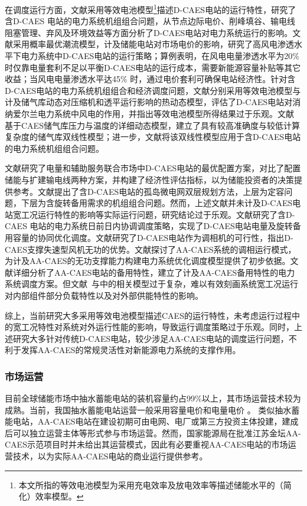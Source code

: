 在调度运行方面，文献采用等效电池模型\footnote{本文所指的等效电池模型为采用充电效率及放电效率等描述储能水平的（简化）效率模型。}描述D-CAES电站的运行特性，研究了含D-CAES 电站的电力系统机组组合问题，从节点边际电价、削峰填谷、输电线阻塞管理、弃风及环境效益等方面分析了D-CAES电站对电力系统运行的影响。文献采用概率最优潮流模型，计及储能电站对市场电价的影响，研究了高风电渗透水平下电力系统中D-CAES电站的运行策略；算例表明，在风电电量渗透水平为20\%时仅靠电量套利不足以平衡D-CAES电站的运行成本，需要新能源容量补贴等其它收益；当风电电量渗透水平达45\% 时，通过电价套利可确保电站经济性。针对含D-CAES电站的电力系统机组组合和经济调度问题，文献分别采用等效电池模型与计及储气库动态对压缩机和透平运行影响的热动态模型，评估了D-CAES电站对消纳爱尔兰电力系统中风电的作用，并指出等效电池模型所得结果过于乐观。文献~ 基于CAES储气库压力与温度的详细动态模型，建立了具有较高准确度与较低计算复杂度的储气库双线性模型；进一步，文献将该双线性模型应用于含D-CAES电站的电力系统机组组合问题。

文献研究了电量和辅助服务联合市场中D-CAES电站的最优配置方案，对比了配置储能与扩建输电线两种方案，并构建了经济性评估指标，以为储能投资者的决策提供参考。文献提出了含D-CAES电站的孤岛微电网双层规划方法，上层为定容问题，下层为含旋转备用需求的机组组合问题。然而，上述文献并未计及D-CAES电站宽工况运行特性的影响等实际运行问题，研究结论过于乐观。文献研究了含D-CAES 电站的电力系统日前日内协调调度策略，实现了D-CAES电站电量及旋转备用容量的协同优化调度。文献研究了D-CAES电站作为调相机的可行性，指出D-CAES支撑失速型风机无功的优势。文献探讨了AA-CAES系统的调相运行模式，为计及AA-CAES的无功支撑能力构建电力系统优化调度模型提供了初步依据。文献详细分析了AA-CAES电站的备用特性，建立了计及AA-CAES备用特性的电力系统调度方案。但文献~与中的相关模型过于复杂，难以有效刻画系统宽工况运行对内部组件部分负载特性以及对外部供能特性的影响。

综上，当前研究大多采用等效电池模型描述CAES的运行特性，未考虑运行过程中的宽工况特性对系统对外运行性能的影响，导致运行调度策略过于乐观。同时，上述研究大多针对传统D-CAES电站，较少涉足AA-CAES电站的调度运行问题，不利于发挥AA-CAES的常规灵活性对新能源电力系统的支撑作用。

\subsubsection{市场运营}
目前全球储能市场中抽水蓄能电站的装机容量约占99\%以上，其市场运营技术较为成熟。当前，我国抽水蓄能电站运营一般采用容量电价和电量电价
\cite{PHP-Market-CN-06,PHP-Price-CN-07}。 类似抽水蓄能电站，AA-CAES电站在建设初期可由电网、电厂或第三方投资主体投建，建成后可以独立运营主体等形式参与市场运营。然而，国家能源局在批准江苏金坛AA-CAES示范项目时并未给出其运营模式，因此有必要重视AA-CAES电站的市场运营技术，以为实际AA-CAES电站的商业运行提供参考。

